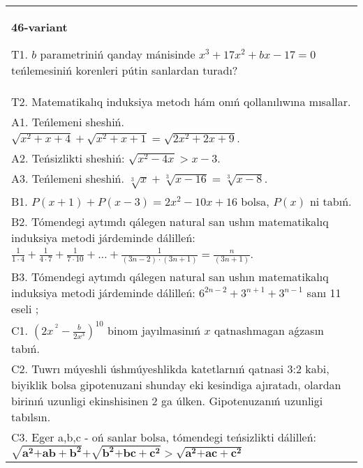 \documentclass{article}
\begin{document}
\begin{tabular}{m{17cm}}
\textbf{46-variant}
\newline

T1. \(b\) parametriniń qanday mánisinde \(x^{3} + 17x^{2} + bx - 17 = 0\) teńlemesiniń korenleri pútin sanlardan turadı? \\
T2. Matematikalıq induksiya metodı hám onıń qollanılıwına mısallar. \\
A1. Teńlemeni sheshiń. \(\sqrt{x^{2} + x + 4} + \sqrt{x^{2} + x + 1} = \sqrt{2x^{2} + 2x + 9}\). \\
A2. Teńsizlikti sheshiń: \(\sqrt{x^{2} - 4x} > x - 3\). \\
A3. Teńlemeni sheshiń. \(\sqrt[3]{x} + \sqrt[3]{x - 16} = \sqrt[3]{x - 8}\). \\
B1. \(P(x + 1) + P(x - 3) = 2x^{2} - 10x + 16\) bolsa, \(P(x)\) ni tabıń. \\
B2. Tómendegi aytımdı qálegen natural san ushın matematikalıq induksiya metodi járdeminde dálilleń: \(\frac{1}{1 \cdot 4} + \frac{1}{4 \cdot 7} + \frac{1}{7 \cdot 10} + \ldots + \frac{1}{(3n - 2) \cdot (3n + 1)} = \frac{n}{(3n + 1)}\). \\
B3. Tómendegi aytımdı qálegen natural san ushın matematikalıq induksiya metodi járdeminde dálilleń: \(6^{2n - 2} + 3^{n + 1} + 3^{n - 1}\) sanı 11 eseli ; \\
C1. \(\left( 2x^{\ ^{2}} - \frac{b}{2x^{3}} \right)^{10}\) binom jayılmasinıń \(x\) qatnashmagan aǵzasın tabıń. \\
C2. Tuwrı múyeshli úshmúyeshlikda katetlarnıń qatnasi 3:2 kabi, biyiklik bolsa gipotenuzani shunday eki kesindiga ajıratadı, olardan birinıń uzunligi ekinshisinen 2 ga úlken. Gipotenuzanıń uzunligi tabılsın. \\
C3. Eger a,b,c - oń sanlar bolsa, tómendegi teńsizlikti dálilleń: \(\sqrt{\mathbf{a}^{\mathbf{2}}\mathbf{+ ab +}\mathbf{b}^{\mathbf{2}}}\mathbf{+}\sqrt{\mathbf{b}^{\mathbf{2}}\mathbf{+ bc +}\mathbf{c}^{\mathbf{2}}}\mathbf{>}\sqrt{\mathbf{a}^{\mathbf{2}}\mathbf{+ ac +}\mathbf{c}^{\mathbf{2}}}\) \\

\end{tabular}
\vspace{1cm}
\end{document}
